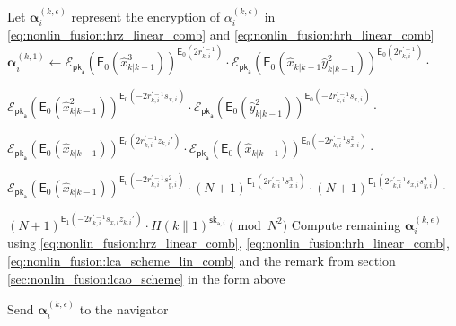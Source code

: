 \begin{algorithm}[htbp]
\begin{algorithmic}[1]
    \State Let $\bm{\alpha}_{i}^{(k,\epsilon)}$ represent the encryption of $\alpha_{i}^{(k,\epsilon)}$ in \eqref{eq:nonlin_fusion:hrz_linear_comb} and \eqref{eq:nonlin_fusion:hrh_linear_comb}
    \State $\bm{\alpha}_{i}^{(k,1)} \gets \mathcal{E}_{\mathsf{pk}_{\mathsf{a}}}\left(\mathsf{E}_{0}\left(\hat{x}^3_{k|k-1}\right)\right)^{\mathsf{E}_{0}\left(2r_{k,i}^{\prime-1}\right)}\cdot\mathcal{E}_{\mathsf{pk}_{\mathsf{a}}}\left(\mathsf{E}_{0}\left(\hat{x}_{k|k-1}\hat{y}^2_{k|k-1}\right)\right)^{\mathsf{E}_{0}\left(2r_{k,i}^{\prime-1}\right)}\cdot$\par
    \quad $\mathcal{E}_{\mathsf{pk}_{\mathsf{a}}}\left(\mathsf{E}_{0}\left(\hat{x}^2_{k|k-1}\right)\right)^{\mathsf{E}_{0}\left(-2r_{k, i}^{\prime-1}s_{x,i}\right)}\cdot\mathcal{E}_{\mathsf{pk}_{\mathsf{a}}}\left(\mathsf{E}_{0}\left(\hat{y}^2_{k|k-1}\right)\right)^{\mathsf{E}_{0}\left(-2r_{k, i}^{\prime-1}s_{x,i}\right)}\cdot$\par
    \quad $\mathcal{E}_{\mathsf{pk}_{\mathsf{a}}}\left(\mathsf{E}_{0}\left(\hat{x}_{k|k-1}\right)\right)^{\mathsf{E}_{0}\left(2r_{k,i}^{\prime-1}z_{k,i}'\right)}\cdot\mathcal{E}_{\mathsf{pk}_{\mathsf{a}}}\left(\mathsf{E}_{0}\left(\hat{x}_{k|k-1}\right)\right)^{\mathsf{E}_{0}\left(-2r_{k,i}^{\prime-1}s_{x,i}^2\right)}\cdot$\par
    \quad $\mathcal{E}_{\mathsf{pk}_{\mathsf{a}}}\left(\mathsf{E}_{0}\left(\hat{x}_{k|k-1}\right)\right)^{\mathsf{E}_{0}\left(-2r_{k,i}^{\prime-1}s_{y,i}^2\right)}\cdot(N+1)^{\mathsf{E}_{1}\left(2r_{k,i}^{\prime-1}s_{x,i}^3\right)}\cdot(N+1)^{\mathsf{E}_{1}\left(2r_{k,i}^{\prime-1}s_{x,i}s_{y,i}^2\right)}\cdot$\par
    \quad $(N+1)^{\mathsf{E}_{1}\left(-2r_{k, i}^{\prime-1}s_{x,i}z_{k,i}'\right)}\cdot H(k\mathbin\|1)^{\mathsf{sk}_{\mathsf{a},i}}\pmod{N^2}$
    \State Compute remaining $\bm{\alpha}_{i}^{(k,\epsilon)}$ using \eqref{eq:nonlin_fusion:hrz_linear_comb}, \eqref{eq:nonlin_fusion:hrh_linear_comb}, \eqref{eq:nonlin_fusion:lca_scheme_lin_comb} and the remark from section \ref{sec:nonlin_fusion:lcao_scheme} in the form above

        \State Send $\bm{\alpha}_{i}^{(k,\epsilon)}$ to the navigator
    \EndFor
    \EndProcedure
\end{algorithmic}
\end{algorithm}


